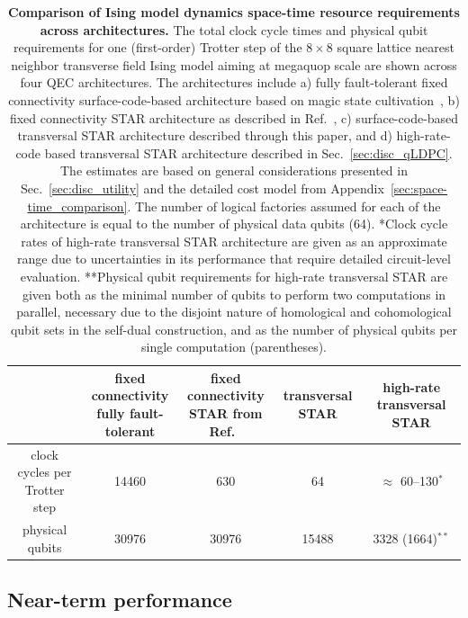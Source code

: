 \documentclass[aps, prx, reprint, superscriptaddress, longbibliography, floatfix]{revtex4-2}
\begin{document}
\begin{table}[ht]
\centering
\renewcommand{\arraystretch}{1.25}
\begin{tabular}{c|c|c|c|c}
\hline \hline
&\makecell{fixed connectivity \\ fully fault-tolerant}& \makecell{fixed connectivity  \\ STAR from Ref.~\cite{Toshio2024}} &   transversal STAR & high-rate transversal STAR \\
\hline
clock cycles per Trotter step & 14460  & 630 & 64 & $\approx$ 60--130$^*$ \\
\hline
physical qubits & 30976 & 30976  & 15488 &  3328 (1664)$^{**}$ \\
\hline \hline
\end{tabular}
\caption{\textbf{Comparison of Ising model dynamics space-time resource requirements across architectures.} The total clock cycle times and physical qubit requirements for one (first-order) Trotter step of the $8\times 8$ square lattice nearest neighbor transverse field Ising model aiming at megaquop scale are shown across four QEC architectures. The architectures include a) fully fault-tolerant fixed connectivity surface-code-based architecture based on magic state cultivation~\cite{Gidney2024}, b) fixed connectivity STAR architecture as described in Ref.~\cite{Toshio2024}, c) surface-code-based transversal STAR architecture described through this paper, and d) high-rate-code based transversal STAR architecture described in Sec.~\ref{sec:disc_qLDPC}. The estimates are based on general considerations presented in Sec.~\ref{sec:disc_utility} and the detailed cost model from Appendix~\ref{sec:space-time_comparison}. The number of logical factories assumed for each of the architecture is equal to the number of physical data qubits (64). *Clock cycle rates of high-rate transversal STAR architecture are given as an approximate range due to uncertainties in its performance that require detailed circuit-level evaluation. **Physical qubit requirements for high-rate transversal STAR are given both as the minimal number of qubits to perform two computations in parallel,  necessary due to the disjoint nature of homological and cohomological qubit sets in the self-dual construction, and as the number of physical qubits per single computation (parentheses).}
\label{tab:resource_summary}
\end{table}

 
 \subsection{Near-term performance}
\label{sec:near_term_performance}
 
\end{document}
